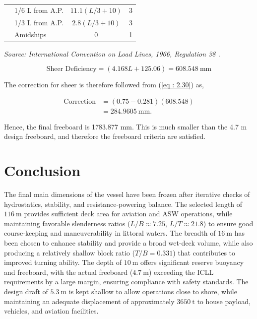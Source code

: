 \documentclass[12pt,a4paper,twoside]{report}
\begin{document}
\begin{enumerate}[\alph*)]
\begin{table}[H]
\begin{tabular}{l l c c}
        & 1/6 L from A.P.
        & $11.1(L/3+10)$
        & 3 \\

        & 1/3 L from A.P.
        & $2.8(L/3+10)$
        & 3 \\

        & Amidships
        & 0
        & 1 \\

        \bottomrule
    \end{tabular}

    \vspace{2mm}

    {\footnotesize
    \textit{Source: International Convention on Load Lines, 1966,
    Regulation 38 \cite{international_load_lines_1966}.}
    }

\end{table}
\[
\text{Sheer Deficiency}
=
(4.168L+125.06)
=
608.548~\mathrm{mm}
\]

The correction for sheer is therefore followed from (\ref{eq : 2.30}) as,

\[
\begin{aligned}
\text{Correction}
&=
\left(0.75-0.281\right)(608.548)\\
&=
284.9605~\mathrm{mm}.
\end{aligned}
\]
\end{enumerate}
\vspace{\baselineskip} \par \noindent Hence, the final freeboard is 1783.877 mm. This is much smaller than the 4.7 m design freeboard, and therefore the freeboard criteria are satisfied.
\clearpage
\section{Conclusion}

The final main dimensions of the vessel have been frozen after
iterative checks of hydrostatics, stability, and resistance-powering
balance. The selected length of $116~\mathrm{m}$ provides sufficient
deck area for aviation and ASW operations, while maintaining
favorable slenderness ratios ($L/B \approx 7.25$, $L/T \approx 21.8$)
to ensure good course-keeping and maneuverability in littoral waters.
The breadth of $16~\mathrm{m}$ has been chosen to enhance stability
and provide a broad wet-deck volume, while also producing a relatively
shallow block ratio ($T/B = 0.331$) that contributes to improved
turning ability. The depth of $10~\mathrm{m}$ offers significant
reserve buoyancy and freeboard, with the actual freeboard
($4.7~\mathrm{m}$) exceeding the ICLL requirements by a large margin,
ensuring compliance with safety standards. The design draft of
$5.3~\mathrm{m}$ is kept shallow to allow operations close to shore,
while maintaining an adequate displacement of approximately
$3650~\mathrm{t}$ to house payload, vehicles, and aviation
facilities.
\end{document}
